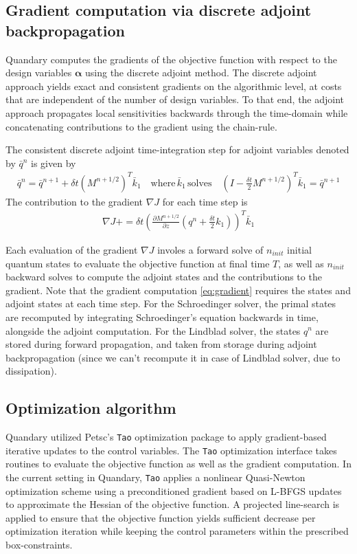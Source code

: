 \documentclass[11pt]{article}
\begin{document}
  
  \subsection{Gradient computation via discrete adjoint backpropagation}
   Quandary computes the gradients of the objective function with respect to the design variables $\boldsymbol{\alpha}$ using the discrete adjoint method. The discrete adjoint approach yields exact and consistent gradients on the algorithmic level, at costs that are independent of the number of design variables.    
   To that end, the adjoint approach propagates local sensitivities backwards through the time-domain while concatenating contributions to the gradient using the chain-rule.

  The consistent discrete adjoint time-integration step for
    adjoint variables denoted by $\bar q^{n}$ is given by
   \begin{align}
      \bar q^{n} = \bar q^{n+1} + \delta t \left(M^{n+1/2}\right)^T \bar k_1
      \quad \text{where} \, \bar k_1 \, \text{solves} \quad \left(
      I-\frac{\delta t}{2} M^{n+1/2}\right)^T  \bar k_1 = \bar q^{n+1} 
    \end{align}
  The contribution to the gradient $\nabla J$ for each time step is
    \begin{align}\label{eq:gradient}
      \nabla J += \delta t \left( \frac{\partial M^{n+1/2}}{\partial z}
      \left(q^n + \frac{\delta t}{2} k_1\right) \right)^T\bar k_1
    \end{align}
  
    Each evaluation of the gradient $\nabla J$ involes a forward solve of $n_{init}$ initial quantum states to evaluate the objective function at final time $T$, as well as $n_{init}$ backward solves to compute the adjoint states and the contributions to the gradient. Note that the gradient computation \eqref{eq:gradient} requires the states and adjoint states at each time step. For the Schroedinger solver, the primal states are recomputed by integrating Schroedinger's equation backwards in time, alongside the adjoint computation. For the Lindblad solver, the states $q^n$ are stored during forward propagation, and taken from storage during adjoint backpropagation (since we can't recompute it in case of Lindblad solver, due to dissipation). 


  \subsection{Optimization algorithm}
    Quandary utilized Petsc's \texttt{Tao} optimization package to apply gradient-based iterative updates to the control variables. The \texttt{Tao} optimization interface takes routines to evaluate the objective function as well as the gradient computation. In the current setting in Quandary, \texttt{Tao} applies a nonlinear Quasi-Newton optimization scheme using a preconditioned gradient based on L-BFGS updates to approximate the Hessian of the objective function. A projected line-search is applied to ensure that the objective function yields sufficient decrease per optimization iteration while keeping the control parameters within the prescribed box-constraints. 
\end{document}
